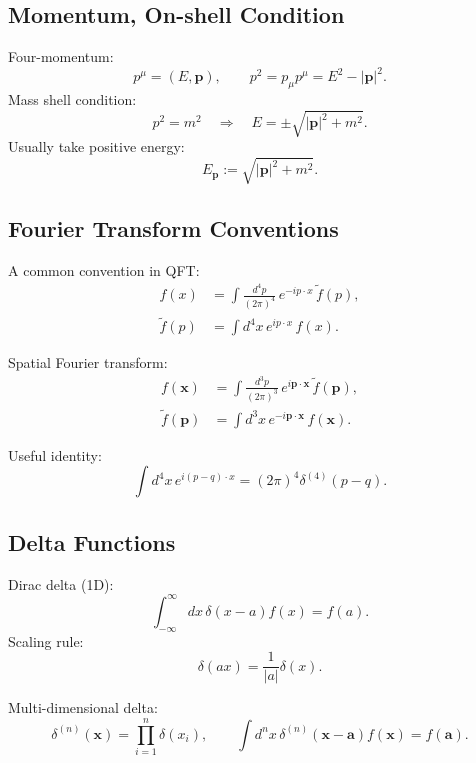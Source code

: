 \subsection{Momentum, On-shell Condition}
Four-momentum:
\begin{equation}
p^\mu=(E,\mathbf{p}), \qquad p^2 = p_\mu p^\mu = E^2-|\mathbf{p}|^2.
\end{equation}
Mass shell condition:
\begin{equation}
p^2 = m^2 \quad \Rightarrow \quad E = \pm \sqrt{|\mathbf{p}|^2+m^2}.
\end{equation}
Usually take positive energy:
\begin{equation}
E_{\mathbf{p}}:=\sqrt{|\mathbf{p}|^2+m^2}.
\end{equation}

\subsection{Fourier Transform Conventions}
A common convention in QFT:
\begin{align}
f(x) &= \int \frac{d^4p}{(2\pi)^4}\, e^{-ip\cdot x}\,\tilde f(p),\\
\tilde f(p) &= \int d^4x\, e^{ip\cdot x}\, f(x).
\end{align}

Spatial Fourier transform:
\begin{align}
f(\mathbf{x}) &= \int \frac{d^3p}{(2\pi)^3}\, e^{i\mathbf{p}\cdot\mathbf{x}}\,\tilde f(\mathbf{p}),\\
\tilde f(\mathbf{p}) &= \int d^3x\, e^{-i\mathbf{p}\cdot\mathbf{x}}\, f(\mathbf{x}).
\end{align}

Useful identity:
\begin{equation}
\int d^4x\, e^{i(p-q)\cdot x} = (2\pi)^4\delta^{(4)}(p-q).
\end{equation}

\subsection{Delta Functions}
Dirac delta (1D):
\begin{equation}
\int_{-\infty}^{\infty} dx\, \delta(x-a) f(x) = f(a).
\end{equation}
Scaling rule:
\begin{equation}
\delta(ax)=\frac{1}{|a|}\delta(x).
\end{equation}

Multi-dimensional delta:
\begin{equation}
\delta^{(n)}(\mathbf{x})=\prod_{i=1}^n \delta(x_i),
\qquad
\int d^n x\, \delta^{(n)}(\mathbf{x}-\mathbf{a}) f(\mathbf{x})=f(\mathbf{a}).
\end{equation}

